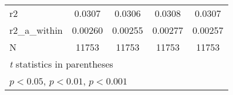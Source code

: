 {\begin{tabular}{l*{4}{c}}
\hline
r2          &      0.0307         &      0.0306         &      0.0308         &      0.0307         \\
r2\_a\_within &     0.00260         &     0.00255         &     0.00277         &     0.00257         \\
N           &       11753         &       11753         &       11753         &       11753         \\
\hline\hline
\multicolumn{5}{l}{\footnotesize \textit{t} statistics in parentheses}\\
\multicolumn{5}{l}{\footnotesize \sym{*} \(p<0.05\), \sym{**} \(p<0.01\), \sym{***} \(p<0.001\)}\\
\end{tabular}
}
